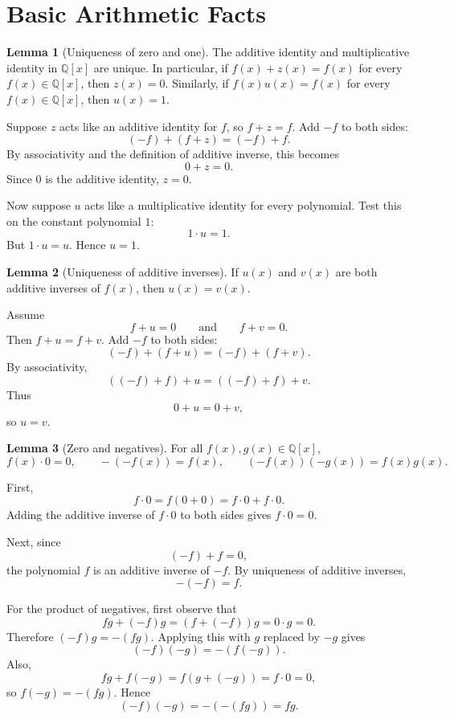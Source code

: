 \documentclass[12pt]{article}
\makeatletter
\theoremstyle{definition}
\newtheorem{lemma}{Lemma}
\newcommand{\Qx}{\mathbb{Q}[x]}
\renewenvironment{proof}[1][\proofname]{%
  \par\pushQED{\qed}%
  \normalfont \topsep6\p@\@plus6\p@\relax
  \trivlist
  \item[\hskip\labelsep\bfseries #1\@addpunct{.}]\ignorespaces
}{%
  \popQED\endtrivlist\@endpefalse
}
\makeatother
\begin{document}
\section{Basic Arithmetic Facts}

\begin{lemma}[Uniqueness of zero and one]
The additive identity and multiplicative identity in $\Qx$ are unique.
In particular, if $f(x)+z(x)=f(x)$ for every $f(x)\in\Qx$, then
$z(x)=0$.  Similarly, if $f(x)u(x)=f(x)$ for every $f(x)\in\Qx$, then
$u(x)=1$.
\end{lemma}

\begin{proof}
Suppose $z$ acts like an additive identity for $f$, so $f+z=f$.  Add $-f$ to
both sides:
\[
(-f)+(f+z)=(-f)+f.
\]
By associativity and the definition of additive inverse, this becomes
\[
0+z=0.
\]
Since $0$ is the additive identity, $z=0$.

Now suppose $u$ acts like a multiplicative identity for every polynomial.  Test
this on the constant polynomial $1$:
\[
1\cdot u=1.
\]
But $1\cdot u=u$.  Hence $u=1$.
\end{proof}

\begin{lemma}[Uniqueness of additive inverses]
If $u(x)$ and $v(x)$ are both additive inverses of $f(x)$, then $u(x)=v(x)$.
\end{lemma}

\begin{proof}
Assume
\[
f+u=0
\qquad\text{and}\qquad
f+v=0.
\]
Then $f+u=f+v$.  Add $-f$ to both sides:
\[
(-f)+(f+u)=(-f)+(f+v).
\]
By associativity,
\[
((-f)+f)+u=((-f)+f)+v.
\]
Thus
\[
0+u=0+v,
\]
so $u=v$.
\end{proof}

\begin{lemma}[Zero and negatives]
For all $f(x),g(x)\in\Qx$,
\[
f(x)\cdot0=0,\qquad -(-f(x))=f(x),\qquad (-f(x))(-g(x))=f(x)g(x).
\]
\end{lemma}

\begin{proof}
First,
\[
f\cdot0=f(0+0)=f\cdot0+f\cdot0.
\]
Adding the additive inverse of $f\cdot0$ to both sides gives $f\cdot0=0$.

Next, since
\[
(-f)+f=0,
\]
the polynomial $f$ is an additive inverse of $-f$.  By uniqueness of additive
inverses,
\[
-(-f)=f.
\]

For the product of negatives, first observe that
\[
fg+(-f)g=(f+(-f))g=0\cdot g=0.
\]
Therefore $(-f)g=-(fg)$.  Applying this with $g$ replaced by $-g$ gives
\[
(-f)(-g)=-(f(-g)).
\]
Also,
\[
fg+f(-g)=f(g+(-g))=f\cdot0=0,
\]
so $f(-g)=-(fg)$.  Hence
\[
(-f)(-g)=-(-(fg))=fg.
\]
\end{proof}
\end{document}
